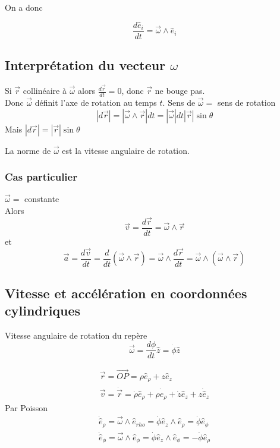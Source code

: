 \documentclass[../main.tex]{subfiles}
\begin{document}
On a donc
\begin{thm}


\[ 
	\frac{ d \hat{e}_i}{dt} = \vec{\omega} \land \hat{e}_i
\]
\end{thm}

\subsection{Interprétation du vecteur $\omega$}
Si  $\vec{r}$ collinéaire à $\vec{\omega}$ alors $\frac{d \vec{r}}{dt}=0$, donc $\vec{r}$ ne bouge pas.\\
Donc $\vec{\omega}$ définit l'axe de rotation au temps $t$.
Sens de $\vec{\omega}=$ sens de rotation
\[ 
|d \vec{r} | = | \vec{\omega} \land \vec{r}| dt = | \vec{\omega} | dt | \vec{r}| \sin \theta
\]
Mais $|d \vec{r}| = | \vec{r}| \sin \theta$

La norme de $\vec{\omega}$ est la vitesse angulaire de rotation.
\subsubsection{Cas particulier}
$\vec{\omega}=$ constante\\
Alors
\[ 
\vec{v}= \frac{d \vec{r}}{dt} = \vec{\omega} \land \vec{r}
\]
et 
\[ 
	\vec{a} = \frac{d \vec{v}}{dt} = \frac{d}{dt} ( \vec{\omega} \land \vec{r}) = \vec{\omega} \land \frac{d \vec{r}}{dt}= \vec{\omega} \land ( \vec{\omega} \land \vec{r})
\]
\subsection{Vitesse et accélération en coordonnées cylindriques}
Vitesse angulaire de rotation du repère
\[ 
	\vec{\omega} = \frac{d \phi}{dt}\hat{z} = \dot{\phi}\hat{z}
\]

\begin{align*}
\vec{r}= \vec{OP} = \rho \hat{e}_{\rho} + z \hat{e}_z\\
\vec{v} = \dot{ \vec{r} } = \dot{\rho} \hat{e}_{\rho}  + \rho \dot{\hat{e}}_{\rho}  + \dot{z} \hat{e}_z + z \dot{ \hat{e} }_z
\end{align*}
Par Poisson
\begin{align*}
	\dot{ \hat{e} }_{\rho} = \vec{\omega} \land \hat{e}_{rho}  = \dot{ \phi } \hat{e}_z \land \hat{e}_{\rho} = \dot{\phi} \hat{e}_{\phi} \\
	\dot{\hat{e}}_{\phi}  = \vec{\omega} \land \hat{e}_{\phi} = \dot{\phi} \hat{e}_z \land \hat{e}_\phi = - \dot{\phi} \hat{e}_{\rho} 
\end{align*}
\end{document}
